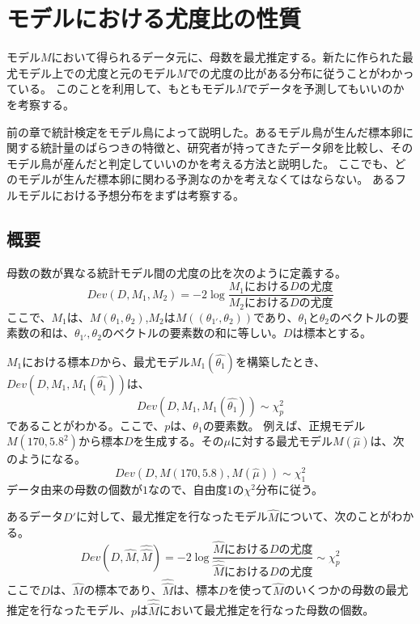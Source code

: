 \chapter{モデルにおける尤度比の性質}
モデル$M$において得られるデータ元に、母数を最尤推定する。新たに作られた最尤モデル上での尤度と元のモデル$M$での尤度の比がある分布に従うことがわかっている。
このことを利用して、もともモデル$M$でデータを予測してもいいのかを考察する。

前の章で統計検定をモデル鳥によって説明した。あるモデル鳥が生んだ標本卵に関する統計量のばらつきの特徴と、研究者が持ってきたデータ卵を比較し、そのモデル鳥が産んだと判定していいのかを考える方法と説明した。
ここでも、どのモデルが生んだ標本卵に関わる予測なのかを考えなくてはならない。
あるフルモデルにおける予想分布をまずは考察する。

\section{概要}

\begin{defi}
 母数の数が異なる統計モデル間の尤度の比を次のように定義する。
 \begin{equation*}
  Dev(D,M_1,M_2) = -2\log\frac{M_1におけるDの尤度}{M_2におけるDの尤度}
 \end{equation*}
 ここで、$M_1$は、$M(\theta_1,\theta_2)$,$M_2$は$M((\theta_{1'},\theta_2))$であり、$\theta_1$と$\theta_2$のベクトルの要素数の和は、$\theta_{1'},\theta_2$のベクトルの要素数の和に等しい。$D$は標本とする。
\end{defi}

$M_1$における標本$D$から、最尤モデル$M_1(\hat{\theta_1})$を構築したとき、$Dev(D,M_1,M_1(\hat{\theta_1}))$は、
\begin{equation*}
    Dev(D,M_1,M_1(\hat{\theta_1})) \sim \chi^2_{p}
\end{equation*}
であることがわかる。ここで、$p$は、$\theta_1$の要素数。
例えば、正規モデル$M(170,5.8^2)$から標本$D$を生成する。その$\mu$に対する最尤モデル$M(\hat{\mu})$は、次のようになる。
\begin{equation*}
    Dev(D,M(170,5.8),M(\hat{\mu})) \sim \chi^2_1
\end{equation*}
データ由来の母数の個数が$1$なので、自由度$1$の$\chi^2$分布に従う。

あるデータ$D'$に対して、最尤推定を行なったモデル$\hat{M}$について、次のことがわかる。
\begin{equation*}
    Dev(D,\hat{M},\hat{\hat{M}}) = -2\log\frac{\hat{M}におけるDの尤度}{\hat{\hat{M}}におけるDの尤度} \sim \chi^2_{p}
\end{equation*}
ここで$D$は、$\hat{M}$の標本であり、$\hat{\hat{M}}$は、標本$D$を使って$\hat{M}$のいくつかの母数の最尤推定を行なったモデル、$p$は$\hat{\hat{M}}$において最尤推定を行なった母数の個数。

